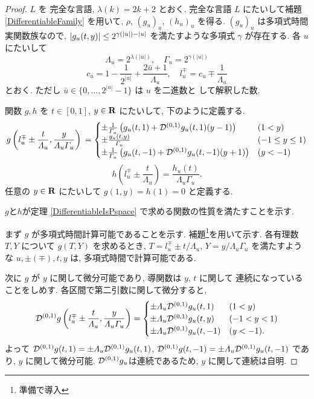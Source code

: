 \begin{proof}
 $L$ を \PSPACE 完全な言語, $\lambda(k) = 2k+2$ とおく.
 \PSPACE 完全な言語 $L$ にたいして補題 \ref{DifferentiableFamily} を用いて,
 $\rho$, $(g_u)_u$, $(h_u)_u$ を得る.
 $(g_u)_u$ は多項式時間実関数族なので, $|g_u(t, y)| \le 2^{{\gamma(|u|)} - |u|}$
 を満たすような多項式 $\gamma$ が存在する.
 各 $u$ にたいして 
 \begin{equation}
  \Lambda_u = 2^{\lambda(|u|)},\quad
   \Gamma_u = 2^{\gamma(|u|)}
 \end{equation}
 \begin{equation}
  c_u = 1-\frac{1}{2^|u|}+\frac{2\bar{u}+1}{\Lambda_u}, \quad
   l_u^\mp=c_u\mp\frac{1}{\varLambda_u}
 \end{equation}
 とおく. ただし $\bar u \in \{0, \dots, 2^{|u|} - 1\}$ は $u$ を二進数と
 して解釈した数.

 関数 $g,h$ を $t \in [0,1]$, $y \in \mathbf R$ にたいして, 下のように定義する.
 \begin{equation}
  g\left(l^\mp_u \pm \frac{t}{\varLambda_u}, \frac{y}{\varLambda_u\varGamma_u}\right) \\
   = \begin{cases}
      \pm \frac{1}{\varGamma_u} \left( g_u(t,1) 
      + \mathcal D^{(0,1)}g_u(t, 1)(y-1) \right)&  (1<y)\\
      \pm \frac{g_u(t, y)}{\varGamma_u} & (-1 \le y \le 1) \\
      \pm \frac{1}{\varGamma_u} \left( g_u(t, -1)
      + \mathcal D^{(0,1)} g_u(t, -1)(y+1) \right) & (y<-1)
     \end{cases}
 \end{equation}
 \begin{equation}
  h \left( l^\mp_u \pm \frac{t}{\Lambda_u} \right) 
   = \frac{h_u(t)}{\Lambda_u\Gamma_u}.
 \end{equation}
 任意の $y\in \mathbf R$ にたいして $g(1,y) = h(1) = 0$ と定義する.

 $g$と$h$が定理 \ref{DifferentiableIsPspace} で求める関数の性質を満たすことを示す.
 
 まず $g$ が多項式時間計算可能であることを示す.
 補題\footnote{準備で導入}を用いて示す.
 各有理数 $T,Y$ について $g(T, Y)$ を求めるとき,
 $T=l_u^\mp \pm t/\Lambda_u$, $Y = y/\Lambda_u\Gamma_u$ を満たすような
 $u, \pm(\mp), t, y$ は, 多項式時間で計算可能である.

 次に $g$ が $y$ に関して微分可能であり, 導関数は $y$, $t$ に関して
 連続になっていることをしめす. 
 各区間で第二引数に関して微分すると,
 \begin{equation}
  \mathcal D^{(0,1)}g \left(l^\mp_u \pm \frac{t}{\varLambda_u}, \frac{y}{\varLambda_u\varGamma_u} \right) = \begin{cases}
		   \pm \varLambda_u \mathcal D^{(0,1)}g_u(t,1) & (1 < y) \\
		   \pm \varLambda_u \mathcal D^{(0,1)}g_u(t,y) & (-1 < y < 1) \\
		   \pm \varLambda_u \mathcal D^{(0,1)}g_u(t,-1) & (y < -1).
		  \end{cases}
 \end{equation}
 よって $\mathcal D^{(0,1)}g(t,1) = \pm \varLambda_u \mathcal D^{(0,1)}g_u(t,1)$, 
 $\mathcal D^{(0,1)}g(t,-1) = \pm \varLambda_u \mathcal D^{(0,1)}g_u(t,-1)$ であり,
 $y$ に関して微分可能. $\mathcal D^{(0,1)}g_u$は連続であるため, $y$ に関して連続は自明.
 

\end{proof}
